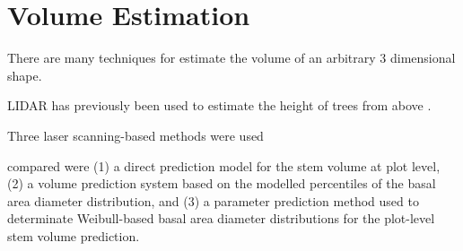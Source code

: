 \section{Volume Estimation}
\label{design:volume estimation}
There are many techniques for estimate the volume of an arbitrary 3 dimensional shape. 

LIDAR has previously been used to estimate the height of trees from above \cite{Maltamo2006}.

Three laser scanning-based methods were used

compared were (1) a direct prediction model for the stem volume at plot level, (2) a volume
prediction system based on the modelled percentiles of the basal area diameter distribution, and (3) a
parameter prediction method used to determinate Weibull-based basal area diameter distributions
for the plot-level stem volume prediction. 